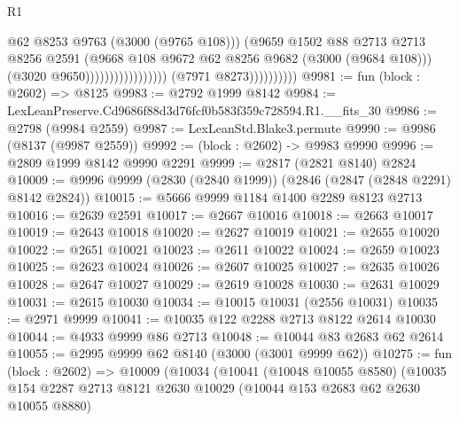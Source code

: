 \begin{lexlean}{R1}
\begin{coremodule}
                                                      @62
                                                      @8253
                                                      @9763
                                                      (@3000 (@9765 @108)))
                                                    (@9659
                                                      @1502
                                                      @88
                                                      @2713
                                                      @2713
                                                      @8256
                                                      @2591
                                                      (@9668
                                                        @108
                                                        @9672
                                                        @62
                                                        @8256
                                                        @9682
                                                        (@3000 (@9684 @108)))
                                                      (@3020 @9650)))))))))))))))))
                      (@7971 @8273))))))))))
@9981 := fun (block : @2602) => @8125
@9983 := @2792 @1999 @8142
@9984 := LexLeanPreserve.Cd9686f88d3d76fcf0b583f359c728594.R1.__fits_30
@9986 := @2798 (@9984 @2559)
@9987 := LexLeanStd.Blake3.permute
@9990 := @9986 (@8137 (@9987 @2559))
@9992 := (block : @2602) -> @9983 @9990
@9996 := @2809 @1999 @8142 @9990 @2291
@9999 := @2817 (@2821 @8140) @2824
@10009 := @9996 @9999 (@2830 (@2840 @1999)) (@2846 (@2847 (@2848 @2291) @8142 @2824))
@10015 := @5666 @9999 @1184 @1400 @2289 @8123 @2713
@10016 := @2639 @2591
@10017 := @2667 @10016
@10018 := @2663 @10017
@10019 := @2643 @10018
@10020 := @2627 @10019
@10021 := @2655 @10020
@10022 := @2651 @10021
@10023 := @2611 @10022
@10024 := @2659 @10023
@10025 := @2623 @10024
@10026 := @2607 @10025
@10027 := @2635 @10026
@10028 := @2647 @10027
@10029 := @2619 @10028
@10030 := @2631 @10029
@10031 := @2615 @10030
@10034 := @10015 @10031 (@2556 @10031)
@10035 := @2971 @9999
@10041 := @10035 @122 @2288 @2713 @8122 @2614 @10030
@10044 := @4933 @9999 @86 @2713
@10048 := @10044 @83 @2683 @62 @2614
@10055 := @2995 @9999 @62 @8140 (@3000 (@3001 @9999 @62))
@10275 := fun (block : @2602) =>
  @10009
    (@10034
      (@10041
        (@10048 @10055 @8580)
        (@10035
          @154
          @2287
          @2713
          @8121
          @2630
          @10029
          (@10044 @153 @2683 @62 @2630 @10055 @8880)

\end{coremodule}
\end{lexlean}
